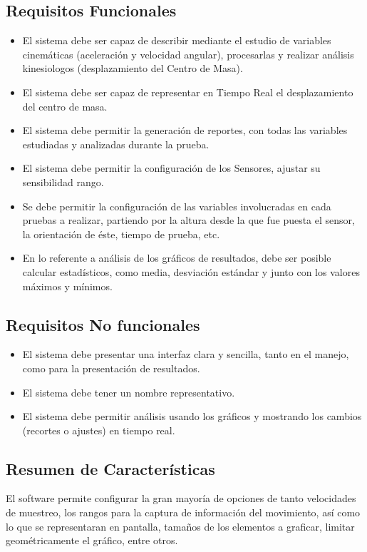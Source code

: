 \documentclass[12pt,a4paper]{article}
\begin{document}
			\subsection{Requisitos Funcionales}
			\begin{itemize}
				\item El sistema debe ser capaz de describir mediante el estudio de variables cinemáticas (aceleración y velocidad angular), procesarlas y realizar análisis kinesiologos (desplazamiento del Centro de Masa).
				\item El sistema debe ser capaz de representar en Tiempo Real el desplazamiento del centro de masa.
				\item El sistema debe permitir la generación de reportes, con todas las variables estudiadas y analizadas durante la prueba.
				\item El sistema debe permitir la configuración de los Sensores, ajustar su sensibilidad rango.
				\item Se debe permitir la configuración de las variables involucradas en cada pruebas a realizar, partiendo por la altura desde la que fue puesta el sensor, la orientación de éste, tiempo de prueba, etc.
				\item En lo referente a análisis de los gráficos de resultados, debe ser posible calcular estadísticos, como media, desviación estándar y junto con los valores máximos y mínimos.
			\end{itemize} 
			
			\subsection{Requisitos No funcionales}
			\begin{itemize}
				\item El sistema debe presentar una interfaz clara y sencilla, tanto en el manejo, como para la presentación de resultados.
				\item El sistema debe tener un nombre representativo.
				\item El sistema debe permitir análisis usando los gráficos y mostrando los cambios (recortes o ajustes) en tiempo real.
			\end{itemize}
			
			\subsection{Resumen de Características}
			El software permite configurar la gran mayoría de opciones de tanto velocidades de muestreo, los rangos para la captura de información del movimiento, así como lo que se representaran en pantalla, tamaños de los elementos a graficar, limitar geométricamente el gráfico, entre otros.
			
\end{document}
